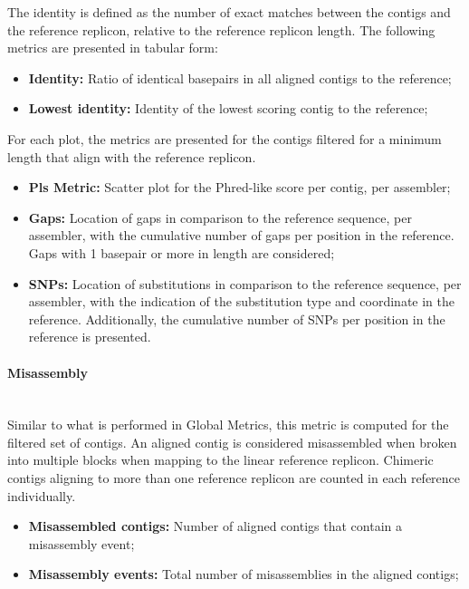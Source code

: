 The identity is defined as the number of exact matches between the contigs and the reference replicon, relative to the reference replicon length. The following metrics are presented in tabular form:

\begin{itemize}
    \item \textbf{Identity:} Ratio of identical basepairs in all aligned contigs to the reference;
    \item \textbf{Lowest identity:} Identity of the lowest scoring contig to the reference;
\end{itemize}

For each plot, the metrics are presented for the contigs filtered for a minimum length that align with the reference replicon.

\begin{itemize}
    \item \textbf{Pls Metric:} Scatter plot for the Phred-like score per contig, per assembler;
    \item \textbf{Gaps: }Location of gaps in comparison to the reference sequence, per assembler, with the cumulative number of gaps per position in the reference. Gaps with 1 basepair or more in length are considered;
    \item \textbf{SNPs:} Location of substitutions in comparison to the reference sequence, per assembler, with the indication of the substitution type and coordinate in the reference. Additionally, the cumulative number of SNPs per position in the reference is presented.
\end{itemize}

\paragraph{Misassembly} \mbox{}\\

Similar to what is performed in Global Metrics, this metric is computed for the filtered set of contigs. An aligned contig is considered misassembled when broken into multiple blocks when mapping to the linear reference replicon. Chimeric contigs aligning to more than one reference replicon are counted in each reference individually. 

\begin{itemize}
    \item \textbf{Misassembled contigs:} Number of aligned contigs that contain a misassembly event;
    \item \textbf{Misassembly events:} Total number of misassemblies in the aligned contigs;
\end{itemize}

